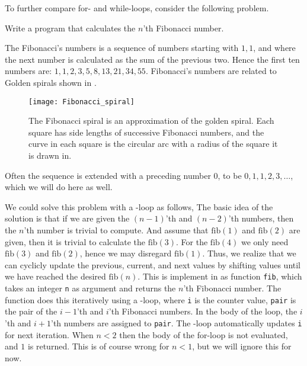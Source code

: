 To further compare for- and while-loops, consider the following problem.
\begin{problem}
  Write a program that calculates the $n$'th Fibonacci number.
\end{problem}
The Fibonacci's numbers is a sequence of numbers starting with $1, 1$, and where the next number is calculated as the sum of the previous two. Hence the first ten numbers are: $1, 1, 2, 3, 5, 8, 13, 21, 34, 55$. Fibonacci's numbers are related to Golden spirals shown in .
\begin{figure}
  \centering
  \texttt{[image: Fibonacci\_spiral]}
  \caption{The Fibonacci spiral is an approximation of the golden spiral. Each square has side lengths of successive Fibonacci numbers, and the curve in each square is the circular arc with a radius of the square it is drawn in.}
  \label{fig:goldenSpiral}
\end{figure}
Often the sequence is extended with a preceding number $0$, to be $0, 1, 1, 2, 3, \dots$, which we will do here as well.

We could solve this problem with a -loop as follows,
%
%
The basic idea of the solution is that if we are given the $(n-1)$'th and $(n-2)$'th numbers, then the $n$'th number is trivial to compute. And assume that $\text{fib}(1)$ and $\text{fib}(2)$ are given, then it is trivial to calculate the $\text{fib}(3)$. For the $\text{fib}(4)$ we only need $\text{fib}(3)$ and $\text{fib}(2)$, hence we may disregard $\text{fib}(1)$. Thus, we realize that we can cyclicly update the previous, current, and next values by shifting values until we have reached the desired $\text{fib}(n)$. This is implement in  as function \lstinline{fib}, which takes an integer \lstinline{n} as argument and returns the $n$'th Fibonacci number. The function does this iteratively using a -loop, where \lstinline{i} is the counter value, \lstinline{pair} is the pair of the $i-1$'th and $i$'th Fibonacci numbers. In the body of the loop, the $i$'th and $i+1$'th numbers are assigned to \lstinline{pair}. The -loop automatically updates \lstinline{i} for next iteration. When $n<2$ then the body of the for-loop is not evaluated, and $1$ is returned. This is of course wrong for $n < 1$, but we will ignore this for now.

